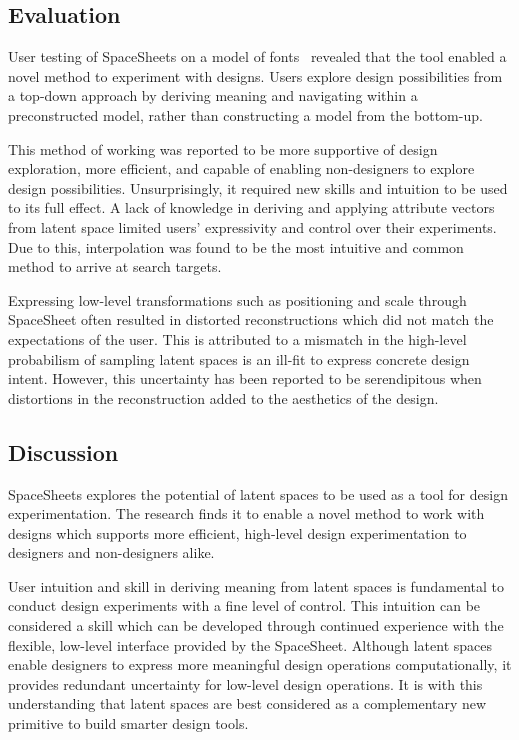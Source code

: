 \documentclass[letterpaper]{article}
\begin{document}
\subsection{Evaluation}

User testing of SpaceSheets on a model of fonts~\cite{loh18} revealed that the tool enabled a novel method to experiment with designs. Users explore design possibilities from a top-down approach by deriving meaning and navigating within a preconstructed model, rather than constructing a model from the bottom-up.

This method of working was reported to be more supportive of design exploration, more efficient, and capable of enabling non-designers to explore design possibilities. Unsurprisingly, it required new skills and intuition to be used to its full effect. A lack of knowledge in deriving and applying attribute vectors from latent space limited users’ expressivity and control over their experiments. Due to this, interpolation was found to be the most intuitive and common method to arrive at search targets.

Expressing low-level transformations such as positioning and scale through SpaceSheet often resulted in distorted reconstructions which did not match the expectations of the user. This is attributed to a mismatch in the high-level probabilism of sampling latent spaces is an ill-fit to express concrete design intent. However, this uncertainty has been reported to be serendipitous when distortions in the reconstruction added to the aesthetics of the design.

\subsection{Discussion}

SpaceSheets explores the potential of latent spaces to be used as a tool for design experimentation. The research finds it to enable a novel method to work with designs which supports more efficient, high-level design experimentation to designers and non-designers alike. 

User intuition and skill in deriving meaning from latent spaces is fundamental to conduct design experiments with a fine level of control. This intuition can be considered a skill which can be developed through continued experience with the flexible, low-level interface provided by the SpaceSheet. Although latent spaces enable designers to express more meaningful design operations computationally, it provides redundant uncertainty for low-level design operations. It is with this understanding that latent spaces are best considered as a complementary new primitive to build smarter design tools.
\end{document}
